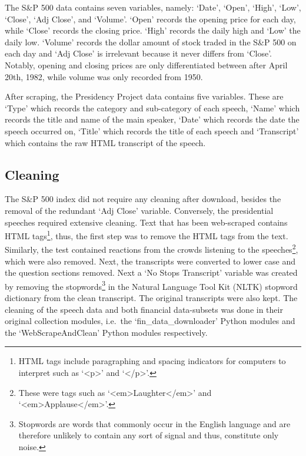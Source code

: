 \documentclass[11pt,preprint, authoryear]{elsarticle}
\numberwithin{equation}{section}
\numberwithin{figure}{section}
\numberwithin{table}{section}
\let\rmarkdownfootnote\footnote%
\def\footnote{\protect\rmarkdownfootnote}
\begin{document}
The S\&P 500 data contains seven variables, namely: `Date', `Open',
`High', `Low', `Close', `Adj Close', and `Volume'. `Open' records the
opening price for each day, while `Close' records the closing price.
`High' records the daily high and `Low' the daily low. `Volume' records
the dollar amount of stock traded in the S\&P 500 on each day and `Adj
Close' is irrelevant because it never differs from `Close'. Notably,
opening and closing prices are only differentiated between after April
20th, 1982, while volume was only recorded from 1950.

After scraping, the Presidency Project data contains five variables.
These are `Type' which records the category and sub-category of each
speech, `Name' which records the title and name of the main speaker,
`Date' which records the date the speech occurred on, `Title' which
records the title of each speech and `Transcript' which contains the raw
HTML transcript of the speech.

\hypertarget{cleaning}{%
\subsection{Cleaning}\label{cleaning}}

The S\&P 500 index did not require any cleaning after download, besides
the removal of the redundant `Adj Close' variable. Conversely, the
presidential speeches required extensive cleaning. Text that has been
web-scraped contains HTML tags\footnote{HTML tags include paragraphing
  and spacing indicators for computers to interpret such as
  `\textless p\textgreater{}' and `\textless/p\textgreater{}'.}, thus,
the first step was to remove the HTML tags from the text. Similarly, the
test contained reactions from the crowds listening to the
speeches\footnote{These were tags such as
  `\textless em\textgreater Laughter\textless/em\textgreater{}' and
  `\textless em\textgreater Applause\textless/em\textgreater{}'.}, which
were also removed. Next, the transcripts were converted to lower case
and the question sections removed. Next a `No Stops Transcript' variable
was created by removing the stopwords\footnote{Stopwords are words that
  commonly occur in the English language and are therefore unlikely to
  contain any sort of signal and thus, constitute only noise.} in the
Natural Language Tool Kit (NLTK) stopword dictionary from the clean
transcript. The original transcripts were also kept. The cleaning of the
speech data and both financial data-subsets was done in their original
collection modules, i.e.~the `fin\_data\_downloader' Python modules and
the `WebScrapeAndClean' Python modules respectively.
\end{document}
